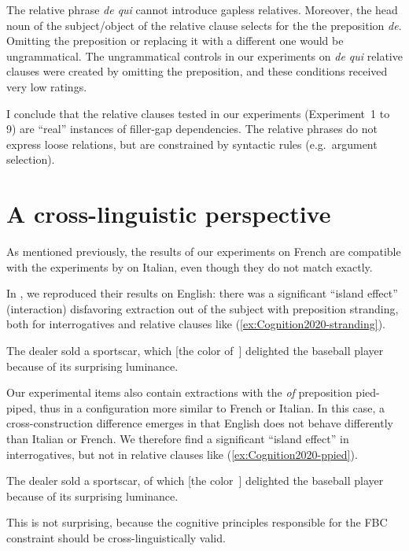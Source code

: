 The relative phrase \emph{de qui} cannot introduce gapless relatives. Moreover, the head noun of the subject/object of the relative clause selects for the the preposition \emph{de}. Omitting the preposition or replacing it with a different one would be ungrammatical. The ungrammatical controls in our experiments on \emph{de qui} relative clauses were created by omitting the preposition, and these conditions received very low ratings. 

I conclude that the relative clauses tested in our experiments (Experiment~1 to 9) are ``real'' instances of filler-gap dependencies. The relative phrases do not express loose relations, but are constrained by syntactic rules (e.g.\ argument selection). 

\section{A cross-linguistic perspective}
\label{ch:exp-conclu-eng}

As mentioned previously, the results of our experiments on French are compatible with the experiments by \citet{Sprouse.2016} on Italian, even though they do not match exactly.

In \citet{Abeille.2020.Cognition}, we reproduced their results on English: there was a significant ``island effect'' (interaction) disfavoring extraction out of the subject with preposition stranding, both for interrogatives and relative clauses like (\ref{ex:Cognition2020-stranding}). 

\ea The dealer sold a sportscar, which [the color of~\trace{}] delighted the baseball player because of its surprising luminance.
\label{ex:Cognition2020-stranding}
\z 

Our experimental items also contain extractions with the \emph{of} preposition pied-piped, thus in a configuration more similar to French or Italian. In this case, a cross-construction difference emerges in that English does not behave differently than Italian or French. We therefore find a significant ``island effect'' in interrogatives, but not in relative clauses like (\ref{ex:Cognition2020-ppied}).

\ea The dealer sold a sportscar, of which [the color~\trace{}] delighted the baseball player because of its surprising luminance.
\label{ex:Cognition2020-ppied}
\z 

This is not surprising, because the cognitive principles responsible for the FBC constraint should be cross-linguistically valid. 

